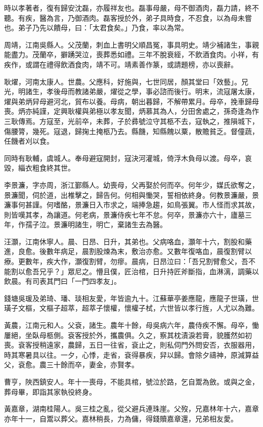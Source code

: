 \begin{pinyinscope}
時以孝著者，復有歸安沈磊，亦履祥友也。磊事母嚴，母不御酒肉，磊力請，終不聽。有疾，醫為言，乃御酒肉。磊客授於外，弟子具時食，不忍食，以為母未嘗也。弟子乃先以饋母，曰：「太君食矣。」乃食，率以為常。

周靖，江南吳縣人。父茂蘭，刺血上書明父順昌冤，事具明史。靖少補諸生，事親能盡力。茂蘭卒，擗踴哭泣，喪葬悉如禮。三年不脫衰絰，不飲酒食肉。小祥，有疾作，或謂在禮得飲酒食肉，靖不可。靖素善作篆，或請題榜，亦以喪辭。

耿燿，河南太康人。世農。父應科，好施與，七世同居，顏其堂曰「效藝」。兄光，明諸生，孝後母而教諸弟嚴，燿從之學，事必諮而後行。明末，流寇屠太康，燿與弟炳舁母避河北，貿布以養。母病，朝出暮歸，不解帶累月。母卒，挽車歸母喪。炳亦純謹，定興耿權與弟極以孝友聞，炳慕其為人，分田舍處之，孫奇逢為作三耿傳焉。方寇至，光前卒，未葬，子於彞號泣守其柩不去，寇執之，推隕城下，傷腰膂，幾死。寇退，歸掬土掩柩乃去。縣饑，知縣餽以粟，散贍貧乏。督僮蔬，任饑者刈以食。

同時有耿輔，虞城人。奉母避寇開封，寇決河灌城，倚浮木負母以渡。母卒，哀毀，緇衣粗食終其世。

李景濂，字亦周，浙江鄞縣人。幼喪母，父再娶於何而卒。何年少，媒氏欲奪之，景濂聞，伺於道，出椎擊之，歸告何。何相與慟哭，誓相依終身。何教景濂嚴，景濂事何甚謹。何嗜酪，景濂日入市求之，端捧急趨，如鳥張翼。市人怪而求其故，則皆嘆其孝，為讓道。何老病，景濂侍疾七年不怠。何卒，景濂亦六十，廬墓三年，作孺子泣。景濂明諸生，明亡，棄諸生去為醫。

汪灝，江南休寧人。晨、日昂、日升，其弟也。父病咯血，灝年十六，割股和藥進，良愈。後數年病足，晨割股煉為末，敷治亦愈。又數年復咯血，晨復割臂以療。更數年，疾大作，灝復割臂，勿瘳。晨病，日昂泣曰：「吾兄割臂愈父，吾不能割以愈吾兄乎？」眾尼之。懵且僕，匠治棺，日升持匠斧斷指，血淋漓，調藥以飲晨。有司表其門曰「一門四孝友」。

錢塘吳瑗及弟琦、璠、琰相友愛，年皆逾九十。江蘇華亭姜應龍，應龍子世璜，世璜子文樞，文樞子超萃，超萃子懷權，懷權子栻，六世皆以孝行旌，人尤以為難。

黃農，江南元和人。父袞，諸生。農年十餘，母吳病六年，農侍疾不懈。母卒，慟屢絕，坐臥母柩側。袞客授於外，攜農俱。久之，察其枕漬淚若膏，貌臒然如初喪。袞客授稍遠家，農歸，五日一往省，袞止之，則私伺門外問安否，衣服器用，時其寒暑具以往。一夕，心悸，走省，袞得暴疾，舁以歸。會除夕禱神，原減算益父，袞愈。農三十餘而卒，妻金，亦賢孝。

曹亨，陜西鎮安人。年十一喪母，不能具棺，號泣於路，乞自鬻為斂。或與之金，葬母畢，即詣其家執役終身。

黃嘉章，湖南桂陽人。吳三桂之亂，從父避兵連珠崖。父歿，兄嘉林年十六，嘉章亦年十一，自鬻以葬父。嘉林稍長，力為傭，得錢贖嘉章還，兄弟相友愛。


\end{pinyinscope}
